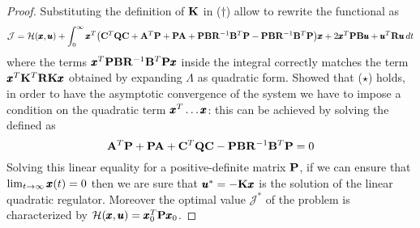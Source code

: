 \begin{proof}
		Substituting the definition of $\K$ in ($\dagger$) allow to rewrite the functional as
		\[ \mathcal J = \mathcal H(\x, \u) + \int_0^\infty \x^T \big(\C^T \Q \C + \A^T \P + \P \A + \P \B \mat R^{-1} \B^T \P - \P \B \mat R^{-1} \B^T \P \big) \x + 2 \x^T \P \B \u + \u^T \mat R \u\, dt \]
		where the terms $\x^T\P \B \mat R^{-1} \B^T \P\x$ inside the integral correctly matches the term $\x^T \K^T \mat  R\K \x$ obtained by expanding $\Lambda$ as quadratic form. Showed that ($\star$) holds, in order to have the asymptotic convergence of the system we have to impose a condition on the quadratic term $\x^T \dots\x$: this can be achieved by solving the  defined as
		\begin{equation} \label{eq:lyap:LQRinvariants}
			\A^T \P + \P\A + \C^T\Q \C - \P \B \mat R^{-1} \B^T \P = 0
		\end{equation} 
		Solving this linear equality for a positive-definite matrix $\P$, if we can ensure that $\lim_{t\rightarrow\infty} \x(t) = 0$ then we are sure that $\u^* = -\K \x$ is the solution of the linear quadratic regulator. Moreover the optimal value $\mathcal J^*$ of the problem is characterized by $\mathcal H(\x,\u) = \x_0^T \P \x_0$.
	
	\end{proof}
	
	
	
	
	
	
	
	
	
	
	
	
	
	
	
	
	
	
	